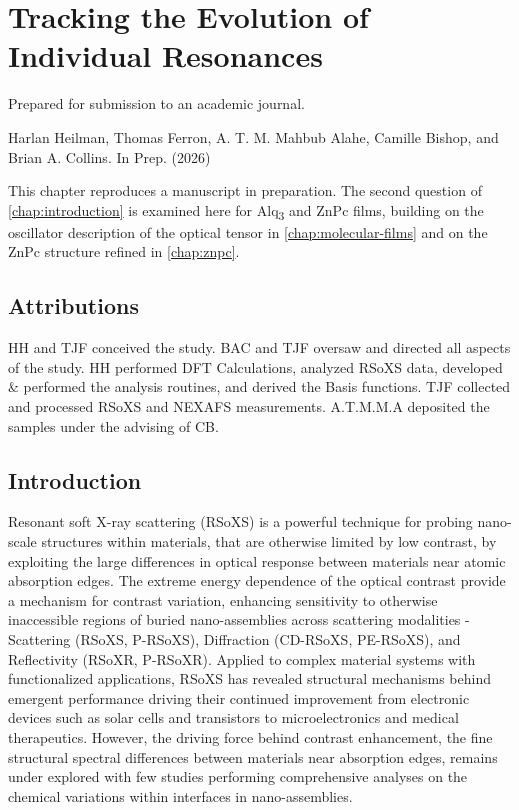 \chapter{Tracking the Evolution of Individual Resonances}\label{chap:resonances}

Prepared for submission to an academic journal.

Harlan Heilman, Thomas Ferron, A. T. M. Mahbub Alahe, Camille Bishop, and Brian A. Collins. In Prep. (2026)

This chapter reproduces a manuscript in preparation. The second question of \cref{chap:introduction} is examined here for Alq\textsubscript{3} and ZnPc films, building on the oscillator description of the optical tensor in \cref{chap:molecular-films} and on the ZnPc structure refined in \cref{chap:znpc}.

\section{Attributions}\label{sec:attributions-1}

HH and TJF conceived the study. BAC and TJF oversaw and directed all aspects of the study. HH performed DFT Calculations, analyzed RSoXS data, developed \& performed the analysis routines, and derived the Basis functions. TJF collected and processed RSoXS and NEXAFS measurements. A.T.M.M.A deposited the samples under the advising of CB.

\section{Introduction}\label{sec:introduction-1}

Resonant soft X-ray scattering (RSoXS) is a powerful technique for probing nano-scale structures within materials, that are otherwise limited by low contrast, by exploiting the large differences in optical response between materials near atomic absorption edges.\autocite{grabnerResonantSoftXRay2025} The extreme energy dependence of the optical contrast provide a mechanism for contrast variation, enhancing sensitivity to otherwise inaccessible regions of buried nano-assemblies across scattering modalities - Scattering (RSoXS, P-RSoXS), Diffraction (CD-RSoXS, PE-RSoXS), and Reflectivity (RSoXR, P-RSoXR). Applied to complex material systems with functionalized applications, RSoXS has revealed structural mechanisms behind emergent performance driving their continued improvement from electronic devices such as solar cells and transistors to microelectronics and medical therapeutics. However, the driving force behind contrast enhancement, the fine structural spectral differences between materials near absorption edges, remains under explored with few studies performing comprehensive analyses on the chemical variations within interfaces in nano-assemblies.


